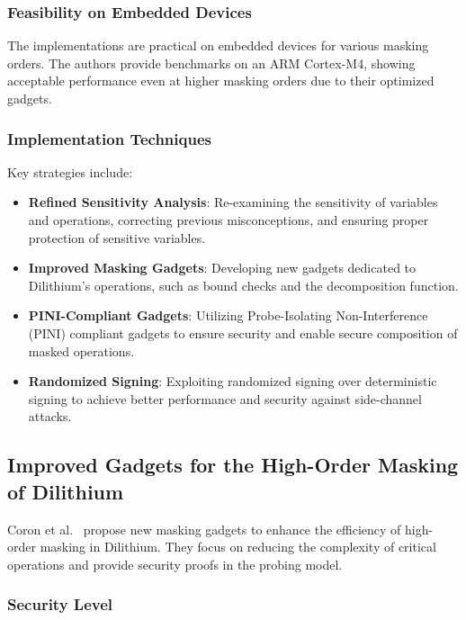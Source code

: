 \subsubsection{Feasibility on Embedded Devices}

The implementations are practical on embedded devices for various masking orders. The authors provide benchmarks on an ARM Cortex-M4, showing acceptable performance even at higher masking orders due to their optimized gadgets.

\subsubsection{Implementation Techniques}

Key strategies include:

\begin{itemize}
    \item \textbf{Refined Sensitivity Analysis}: Re-examining the sensitivity of variables and operations, correcting previous misconceptions, and ensuring proper protection of sensitive variables.
    \item \textbf{Improved Masking Gadgets}: Developing new gadgets dedicated to Dilithium's operations, such as bound checks and the decomposition function.
    \item \textbf{PINI-Compliant Gadgets}: Utilizing Probe-Isolating Non-Interference (PINI) compliant gadgets to ensure security and enable secure composition of masked operations.
    \item \textbf{Randomized Signing}: Exploiting randomized signing over deterministic signing to achieve better performance and security against side-channel attacks.
\end{itemize}

\subsection{Improved Gadgets for the High-Order Masking of Dilithium}

Coron et al.\ \cite{Coron23} propose new masking gadgets to enhance the efficiency of high-order masking in Dilithium. They focus on reducing the complexity of critical operations and provide security proofs in the probing model.

\subsubsection{Security Level}

